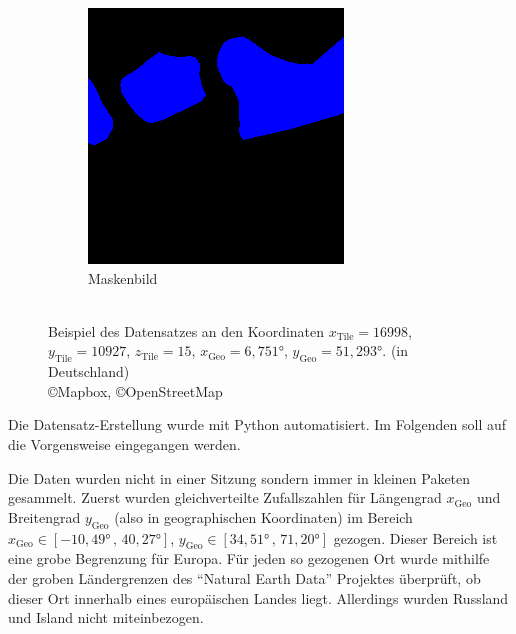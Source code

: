 \begin{figure}
\begin{subfigure}{0.3\textwidth}
        \includegraphics[width=\textwidth]{images/datensatz_beispiel_maske.png}
        \caption{Maskenbild}
        \label{fig:datensatz_beispiel_maske.png}
    \end{subfigure}
    \caption{\\Beispiel des Datensatzes an den Koordinaten %
            ${x_\text{Tile} = 16998}$, ${y_\text{Tile} = 10927}$, ${z_\text{Tile} = 15}$, %
            ${x_\text{Geo} = 6,751°}$, ${y_\text{Geo} = 51,293°}$. %
            (in Deutschland) \\ \copyright Mapbox, \copyright OpenStreetMap}
    \label{fig:datensatz_beispiel}
\end{figure}

Die Datensatz-Erstellung wurde mit Python automatisiert.
Im Folgenden soll auf die Vorgensweise eingegangen werden.

Die Daten wurden nicht in einer Sitzung sondern immer in kleinen Paketen gesammelt.
Zuerst wurden gleichverteilte Zufallszahlen für Längengrad $x_\text{Geo}$ und Breitengrad $y_\text{Geo}$ (also in geographischen Koordinaten) 
im Bereich $x_\text{Geo} \in [-10,49° \,,\, 40,27°]$, $y_\text{Geo} \in [34,51° \,,\, 71,20°]$ gezogen.
Dieser Bereich ist eine grobe Begrenzung für Europa.
Für jeden so gezogenen Ort wurde mithilfe der groben Ländergrenzen des \enquote{Natural Earth Data} Projektes überprüft, 
ob dieser Ort innerhalb eines europäischen Landes liegt. \cite{natural_earth_countries}
Allerdings wurden Russland und Island nicht miteinbezogen.

